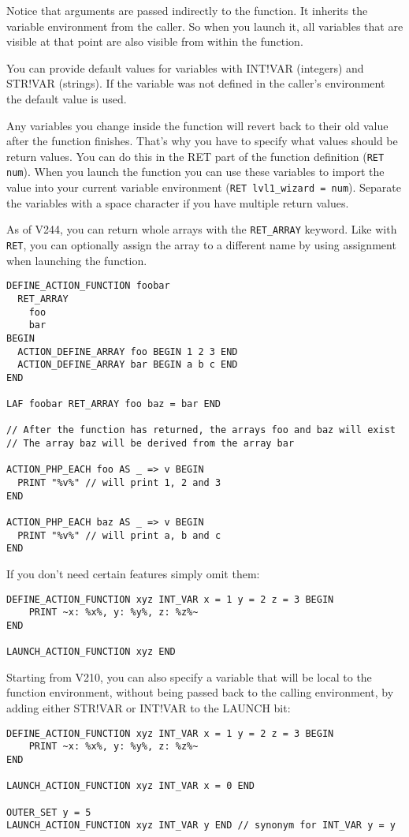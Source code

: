 \documentclass{article}
\begin{document}
Notice that arguments are passed indirectly to the function.
It inherits the variable environment from the caller. So when you launch it,
all variables that are visible at that point are also visible from within the function.

You can provide default values for variables with INT!VAR (integers) and STR!VAR (strings).
If the variable was not defined in the caller's environment the default value is used.

Any variables you change inside the function will revert back to their old value
after the function finishes.
That's why you have to specify what values should be return values.
You can do this in the RET part of the function definition (\verb+RET num+).
When you launch the function you can use these variables to import the value
into your current variable environment (\verb+RET lvl1_wizard = num+).
Separate the variables with a space character if you have multiple return values.

As of V244, you can return whole arrays with the \verb+RET_ARRAY+
keyword. Like with \verb+RET+, you can optionally assign the array to
a different name by using assignment when launching the function.

\begin{verbatim}
DEFINE_ACTION_FUNCTION foobar
  RET_ARRAY
    foo
    bar
BEGIN
  ACTION_DEFINE_ARRAY foo BEGIN 1 2 3 END
  ACTION_DEFINE_ARRAY bar BEGIN a b c END
END

LAF foobar RET_ARRAY foo baz = bar END

// After the function has returned, the arrays foo and baz will exist
// The array baz will be derived from the array bar

ACTION_PHP_EACH foo AS _ => v BEGIN
  PRINT "%v%" // will print 1, 2 and 3
END

ACTION_PHP_EACH baz AS _ => v BEGIN
  PRINT "%v%" // will print a, b and c
END

\end{verbatim}

If you don't need certain features simply omit them:
\begin{verbatim}
DEFINE_ACTION_FUNCTION xyz INT_VAR x = 1 y = 2 z = 3 BEGIN
    PRINT ~x: %x%, y: %y%, z: %z%~
END

LAUNCH_ACTION_FUNCTION xyz END
\end{verbatim}

Starting from V210, you can also specify a variable that will be local to the
function environment, without being passed back to the calling environment,
by adding either STR!VAR or INT!VAR to the LAUNCH bit:
\begin{verbatim}
DEFINE_ACTION_FUNCTION xyz INT_VAR x = 1 y = 2 z = 3 BEGIN
    PRINT ~x: %x%, y: %y%, z: %z%~
END

LAUNCH_ACTION_FUNCTION xyz INT_VAR x = 0 END

OUTER_SET y = 5
LAUNCH_ACTION_FUNCTION xyz INT_VAR y END // synonym for INT_VAR y = y
\end{verbatim}
\end{document}

